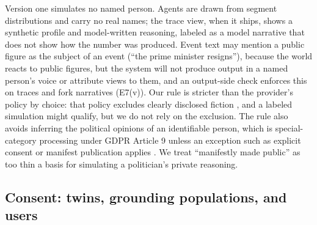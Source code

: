 \documentclass[11pt]{article}
\begin{document}
Version one simulates no named person. Agents are drawn from segment distributions and carry no real names; the trace view, when it ships, shows a synthetic profile and model-written reasoning, labeled as a model narrative that does not show how the number was produced. Event text may mention a public figure as the subject of an event (``the prime minister resigns''), because the world reacts to public figures, but the system will not produce output in a named person's voice or attribute views to them, and an output-side check enforces this on traces and fork narratives (E7(v)). Our rule is stricter than the provider's policy by choice: that policy excludes clearly disclosed fiction \citep{anthropic2026aup}, and a labeled simulation might qualify, but we do not rely on the exclusion. The rule also avoids inferring the political opinions of an identifiable person, which is special-category processing under GDPR Article 9 unless an exception such as explicit consent or manifest publication applies \citep{gdpr2016}. We treat ``manifestly made public'' as too thin a basis for simulating a politician's private reasoning.

\subsection{Consent: twins, grounding populations, and users}
\label{sec:consent}
\end{document}
